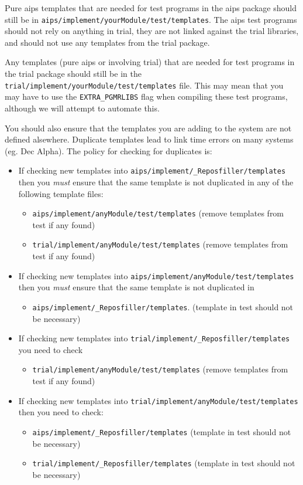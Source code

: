 Pure aips templates that are needed for test programs in the aips package
should still be in \texttt{aips/implement/yourModule/test/templates}. The
aips test programs should not rely on anything in trial, they are not linked
against the trial libraries, and should not use any templates from the trial
package.

Any templates (pure aips or involving trial) that are needed for test
programs in the trial package should still be in the
\texttt{trial/implement/yourModule/test/templates} file. This may mean that
you may have to use the \texttt{EXTRA\_PGMRLIBS} flag when compiling these
test programs, although we will attempt to automate this.

You should also ensure that the templates you are adding to the system are
not defined alsewhere. Duplicate templates lead to
link time errors on many systems (eg. Dec Alpha). The policy for checking
for duplicates is:
\begin{itemize}
\item If checking new templates into
  \texttt{aips/implement/\_Reposfiller/templates} then you \emph{must}
  ensure that the same template is not duplicated in any of the following
  template files:
  \begin{itemize}
  \item \texttt{aips/implement/anyModule/test/templates} 
    (remove templates from test if any found)
  \item \texttt{trial/implement/anyModule/test/templates} 
    (remove templates from test if any found)
  \end{itemize}
\item If checking new templates into
  \texttt{aips/implement/anyModule/test/templates} then you \emph{must}
  ensure that the same template is not duplicated in
  \begin{itemize}
  \item \texttt{aips/implement/\_Reposfiller/templates}.  (template in
    test should not be necessary)
  \end{itemize}
\item If checking new templates into
  \texttt{trial/implement/\_Reposfiller/templates} you need to check
  \begin{itemize}
  \item \texttt{trial/implement/anyModule/test/templates} (remove templates
    from test if any found)
  \end{itemize}
\item If checking new templates into
  \texttt{trial/implement/anyModule/test/templates} then you need to check:
  \begin{itemize}
  \item \texttt{aips/implement/\_Reposfiller/templates} (template in test
    should not be necessary)
  \item \texttt{trial/implement/\_Reposfiller/templates} (template in test
    should not be necessary)
  \end{itemize}
  
\end{itemize}

